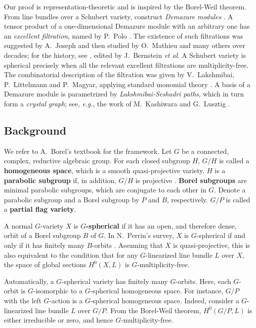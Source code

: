 \documentclass[12pt]{amsart}
\theoremstyle{definition}
\theoremstyle{remark}
\begin{document}
Our proof is representation-theoretic and is inspired by the Borel-Weil theorem. From line bundles over a Schubert variety, construct \textit{Demazure modules} \cite[\S 5.4]{MR0354697}. A tensor product of a one-dimensional Demazure module with an arbitrary one has an \textit{excellent filtration}, named by P.~Polo \cite{MR1021515}. The existence of such filtrations was suggested by A.~Joseph and then studied by O.~Mathieu and many others over decades; for the history, see \cite{MR2214240}, edited by J.~Bernstein \textit{et al}. A Schubert variety is spherical precisely when all the relevant excellent filtrations are multiplicity-free. The combinatorial description of the filtration was given by V.~Lakshmibai, P.~Littelmann and P.~Magyar, applying standard monomial theory \cite{MR1887117}. A basis of a Demazure module is parametrized by \textit{Lakshmibai-Seshadri paths}, which in turn form a \textit{crystal graph}; see, \textit{e.g.}, the work of M.~Kashiwara \cite{MR1240605} and G.~Lusztig \cite{MR1227098}.



\subsection{Background}

We refer to A.~Borel's textbook \cite[\S 6]{MR1102012} for the framework. Let $G$ be a connected, complex, reductive algebraic group. For each closed subgroup $H$, $G/H$ is called a \textbf{homogeneous space}, which is a smooth quasi-projective variety. $H$ is a \textbf{parabolic subgroup} if, in addition, $G/H$ is projective \cite[\S 11]{MR1102012}. \textbf{Borel subgroups} are minimal parabolic subgroups, which are conjugate to each other in $G$. Denote a parabolic subgroup and a Borel subgroup by $P$ and $B$, respectively. $G/P$ is called a \textbf{partial flag variety}.

A normal $G$-variety $X$ is \textbf{$G$-spherical} if it has an open, and therefore dense, orbit of a Borel subgroup $B$ of $G$. In N.~Perrin's survey, $X$ is $G$-spherical if and only if it has finitely many $B$-orbits \cite[Theorem 2.1.2]{MR3177371}. Assuming that $X$ is quasi-projective, this is also equivalent to the condition that for any $G$-linearized line bundle $L$ over $X$, the space of global sections $H^0 (X , L)$ is $G$-multiplicity-free.

Automatically, a $G$-spherical variety has finitely many $G$-orbits. Here, each $G$-orbit is $G$-isomorphic to a $G$-spherical homogeneous space. For instance, $G/P$ with the left $G$-action is a $G$-spherical homogeneous space. Indeed, consider a $G$-linearized line bundle $L$ over $G/P$. From the Borel-Weil theorem, $H^0(G/P , L)$ is either irreducible or zero, and hence $G$-multiplicity-free.
\end{document}
